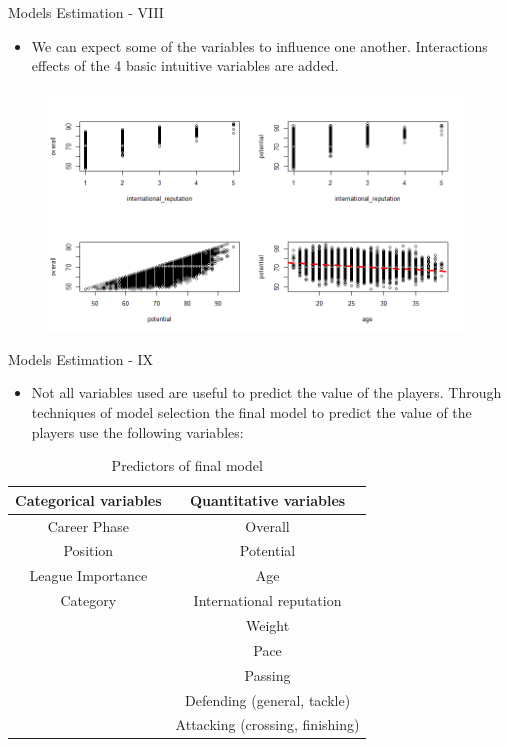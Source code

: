 \documentclass[aspectratio=169,xcolor=dvipsnames]{beamer}
\begin{document}
\begin{frame}{Models Estimation - VIII}
\begin{itemize}
\item We can expect some of the variables to influence one another. Interactions effects of the 4 basic intuitive variables are added.
\end{itemize}

\begin{figure}[H] 
\begin{center}
  \includegraphics[width=11cm]{interactions.png}
\end{center}
\end{figure}

\end{frame}


\begin{frame}{Models Estimation - IX}
\begin{itemize}
\item Not all variables used are useful to predict the value of the players. Through techniques of model selection the final model to predict the value of the players use the following variables:
\end{itemize}

\begin{table}[ht]
\centering
\begin{tabular}{cc}
  \hline
    Categorical variables & Quantitative variables \\ 
  \hline
    Career Phase & Overall \\ 
    Position & Potential \\ 
    League Importance & Age \\ 
    Category & International reputation \\
        & Weight \\
        & Pace \\
        & Passing \\
        & Defending (general, tackle) \\
        & Attacking (crossing, finishing) \\
   \hline
\end{tabular}
\caption{Predictors of final model}
\end{table}
\end{frame}
\end{document}
